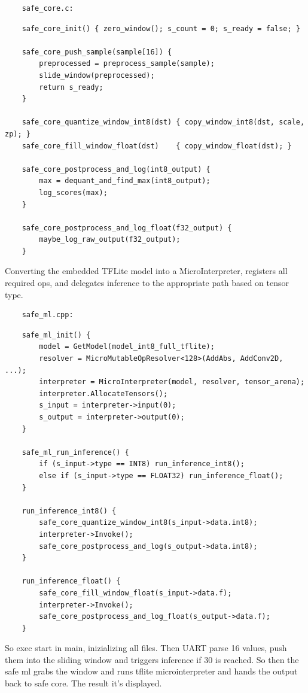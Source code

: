 \begin{verbatim}
    safe_core.c:
\end{verbatim}
\begin{lstlisting}
    safe_core_init() { zero_window(); s_count = 0; s_ready = false; }
    
    safe_core_push_sample(sample[16]) {
        preprocessed = preprocess_sample(sample);
        slide_window(preprocessed);
        return s_ready;
    }
    
    safe_core_quantize_window_int8(dst) { copy_window_int8(dst, scale, zp); }
    safe_core_fill_window_float(dst)    { copy_window_float(dst); }
    
    safe_core_postprocess_and_log(int8_output) {
        max = dequant_and_find_max(int8_output);
        log_scores(max);
    }
    
    safe_core_postprocess_and_log_float(f32_output) {
        maybe_log_raw_output(f32_output);
    }
\end{lstlisting}
Converting the embedded TFLite model into a MicroInterpreter, registers all required ops, and delegates inference to the appropriate path based on tensor type.

\begin{verbatim}
    safe_ml.cpp: 
\end{verbatim}
\begin{lstlisting}
    safe_ml_init() {
        model = GetModel(model_int8_full_tflite);
        resolver = MicroMutableOpResolver<128>(AddAbs, AddConv2D, ...);
        interpreter = MicroInterpreter(model, resolver, tensor_arena);
        interpreter.AllocateTensors();
        s_input = interpreter->input(0);
        s_output = interpreter->output(0);
    }
    
    safe_ml_run_inference() {
        if (s_input->type == INT8) run_inference_int8();
        else if (s_input->type == FLOAT32) run_inference_float();
    }
    
    run_inference_int8() {
        safe_core_quantize_window_int8(s_input->data.int8);
        interpreter->Invoke();
        safe_core_postprocess_and_log(s_output->data.int8);
    }
    
    run_inference_float() {
        safe_core_fill_window_float(s_input->data.f);
        interpreter->Invoke();
        safe_core_postprocess_and_log_float(s_output->data.f);
    }
\end{lstlisting}
So exec start in main, inizializing all files. Then UART parse 16 values, push them into the sliding window and triggers inference if 30 is reached. So then the safe ml grabs the window and runs tflite microinterpreter and hands the output back to safe core. The result it's displayed.

